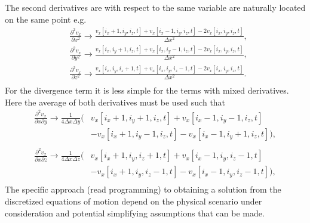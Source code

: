 The second derivatives are with respect to the same variable are naturally located on the same point e.g.
\begin{equation}
	\begin{split}
		&\frac{\partial^2 v_x}{\partial x^2} \rightarrow  \frac{v_x[i_x+1,i_y,i_z,t]+v_x[i_x-1,i_y,i_z,t]-2v_x[i_x,i_y,i_z,t]}{\Delta x^2},\\
		&\frac{\partial^2 v_x}{\partial y^2}\rightarrow   \frac{v_x[i_x,i_y+1,i_z,t]+v_x[i_x,i_y-1,i_z,t]-2v_x[i_x,i_y,i_z,t]}{\Delta x^2},\\
		&\frac{\partial^2 v_x}{\partial z^2}\rightarrow  \frac{v_x[i_x,i_y,i_z+1,t]+v_x[i_x,i_y,i_z-1,t]-2v_x[i_x,i_y,i_z,t]}{\Delta x^2}.\\
	\end{split}
\end{equation}
For the divergence term it is less simple for the terms with mixed derivatives. Here the average of both derivatives must be used such that
\begin{equation}
	\begin{split}
		\frac{\partial^2 v_x}{\partial x\partial y} \rightarrow \frac{1}{4\Delta x \Delta y}\bigg(&v_x[i_x+1,i_y+1,i_z,t]+v_x[i_x-1,i_y-1,i_z,t]\\
		&-v_x[i_x+1,i_y-1,i_z,t]-v_x[i_x-1,i_y+1,i_z,t]\bigg),\\
	\end{split}
\end{equation}                           
\begin{equation}
	\begin{split}
		\frac{\partial^2 v_x}{\partial x\partial z} \rightarrow \frac{1}{4\Delta x \Delta z}\bigg(&v_x[i_x+1,i_y,i_z+1,t]+v_x[i_x-1,i_y,i_z-1,t]\\
		&-v_x[i_x+1,i_y,i_z-1,t]-v_x[i_x-1,i_y,i_z-1,t]\bigg),\\
	\end{split}
\end{equation}   
The specific approach (read programming) to obtaining a solution from the discretized equations of motion depend on the physical scenario under consideration and potential simplifying assumptions that can be made.

